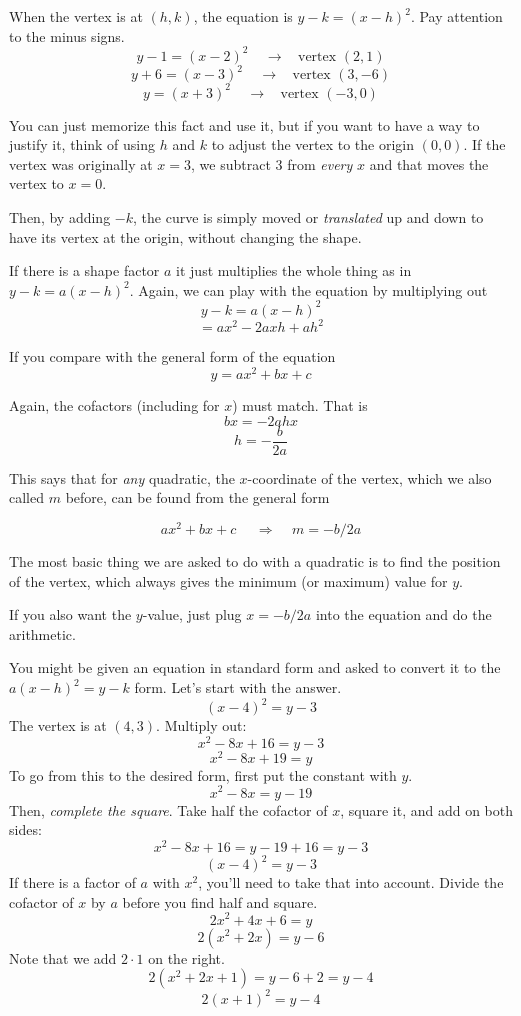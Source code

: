 \documentclass[11pt, oneside]{article}
\begin{document}
When the vertex is at $(h,k)$, the equation is $y - k = (x - h)^2$.  Pay attention to the minus signs.
\[ y - 1 = (x - 2)^2 \ \ \ \ \ \rightarrow \ \ \ \ \text{vertex } (2,1) \]
\[ y + 6 = (x - 3)^2 \ \ \ \ \ \rightarrow \ \ \ \ \text{vertex } (3,-6) \]
\[ y = (x + 3)^2 \ \ \ \ \ \rightarrow \ \ \ \ \text{vertex } (-3,0) \]

You can just memorize this fact and use it, but if you want to have a way to justify it, think of using $h$ and $k$ to adjust the vertex to the origin $(0,0)$.  If the vertex was originally at $x = 3$, we subtract $3$ from \emph{every} $x$ and that moves the vertex to $x = 0$.

Then, by adding $-k$, the curve is simply moved or \emph{translated} up and down to have its vertex at the origin, without changing the shape.

If there is a shape factor $a$ it just multiplies the whole thing as in $y - k = a(x - h)^2$.  Again, we can play with the equation by multiplying out
\[ y - k = a(x - h)^2 \]
\[ = ax^2 - 2axh + ah^2 \]

If you compare with the general form of the equation
\[ y = ax^2 + bx + c \]

Again, the cofactors (including for $x$) must match.  That is
\[ bx = - 2ahx \]
\[ h = - \frac{b}{2a} \]

This says that for \emph{any} quadratic, the $x$-coordinate of the vertex, which we also called $m$ before, can be found from the general form

\[ ax^2 + bx + c  \ \ \ \ \ \ \Rightarrow  \ \ \ \ \ m = -b/2a \]

The most basic thing we are asked to do with a quadratic is to find the position of the vertex, which always gives the minimum (or maximum) value for $y$.

If you also want the $y$-value, just plug $x = -b/2a$ into the equation and do the arithmetic.

You might be given an equation in standard form and asked to convert it to the $a(x-h)^2 = y - k$ form.  Let's start with the answer.
\[ (x - 4)^2 = y - 3 \]
The vertex is at $(4,3)$.  Multiply out:
\[ x^2 - 8x + 16 = y - 3 \]
\[ x^2 - 8x + 19 = y \]
To go from this to the desired form, first put the constant with $y$.
\[ x^2 - 8x = y - 19 \]
Then, \emph{complete the square}.  Take half the cofactor of $x$, square it, and add on both sides:
\[ x^2 - 8x + 16 = y - 19 + 16 = y - 3 \]
\[ (x - 4)^2 = y - 3 \]
If there is a factor of $a$ with $x^2$, you'll need to take that into account.  Divide the cofactor of $x$ by $a$ before you find half and square.
\[ 2x^2 + 4x + 6 = y \]
\[ 2(x^2 + 2x) = y - 6 \]
Note that we add $2 \cdot 1$ on the right.
\[ 2(x^2 + 2x + 1) = y - 6 + 2 = y - 4 \]
\[ 2(x + 1)^2 = y - 4 \]
\end{document}
